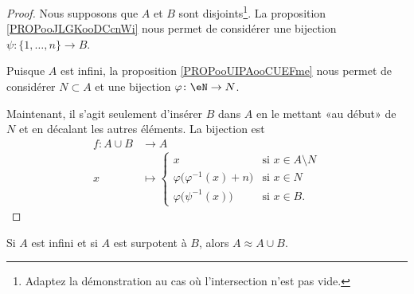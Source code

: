 \begin{proof}
	Nous supposons que \( A\) et \( B\) sont disjoints\footnote{Adaptez la démonstration au cas où l'intersection n'est pas vide.}. La proposition \ref{PROPooJLGKooDCcnWi} nous permet de considérer une bijection \( \psi\colon \{ 1,\ldots, n \}\to B\).

	Puisque \( A\) est infini, la proposition \ref{PROPooUIPAooCUEFme} nous permet de considérer \( N\subset A\) et une bijection \( \varphi\colon \eN\to N\).

	Maintenant, il s'agit seulement d'insérer \( B\) dans \( A\) en le mettant «au début» de \( N\) et en décalant les autres éléments. La bijection est
	\begin{equation}
		\begin{aligned}
			f\colon A\cup B & \to A                                                                                  \\
			x               & \mapsto \begin{cases}
				                          x                                    & \text{si } x\in A\setminus N \\
				                          \varphi\big( \varphi^{-1}(x)+n \big) & \text{si } x\in N            \\
				                          \varphi\big( \psi^{-1}(x) \big)      & \text{si }x\in B.
			                          \end{cases}
		\end{aligned}
	\end{equation}
\end{proof}

\begin{lemma}       \label{LEMooXMVDooIWLWis}
	Si \( A\) est infini et si \( A\) est surpotent à \( B\), alors \( A\approx A\cup B\).
\end{lemma}

